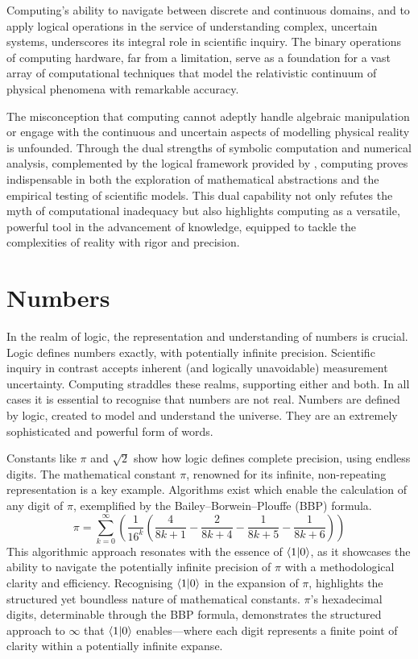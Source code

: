 \documentclass[12pt]{article}
\begin{document}
Computing's ability to navigate between discrete and continuous domains, and to apply logical operations in the service of understanding complex, uncertain systems, underscores its integral role in scientific inquiry. The binary operations of computing hardware, far from a limitation, serve as a foundation for a vast array of computational techniques that model the relativistic continuum of physical phenomena with remarkable accuracy.

The misconception that computing cannot adeptly handle algebraic manipulation or engage with the continuous and uncertain aspects of modelling physical reality is unfounded. Through the dual strengths of symbolic computation and numerical analysis, complemented by the logical framework provided by \iR{}, computing proves indispensable in both the exploration of mathematical abstractions and the empirical testing of scientific models. This dual capability not only refutes the myth of computational inadequacy but also highlights computing as a versatile, powerful tool in the advancement of knowledge, equipped to tackle the complexities of reality with rigor and precision.

\section*{Numbers}

In the realm of logic, the representation and understanding of numbers is crucial. Logic defines numbers exactly, with potentially infinite precision. Scientific inquiry in contrast accepts inherent (and logically unavoidable) measurement uncertainty. Computing straddles these realms, supporting either and both. In all cases it is essential to recognise that numbers are not real. Numbers are defined by logic, created to model and understand the universe. They are an extremely sophisticated and powerful form of words.

Constants like \(\pi\) and \(\sqrt{2}\) show how logic defines complete precision, using endless digits. The mathematical constant \(\pi\), renowned for its infinite, non-repeating representation is a key example. Algorithms exist which enable the calculation of any digit of \(\pi\), exemplified by the Bailey–Borwein–Plouffe (BBP) formula.
\[ \pi = \sum_{k=0}^{\infty} \left( \frac{1}{16^k} \left( \frac{4}{8k + 1} - \frac{2}{8k + 4} - \frac{1}{8k + 5} - \frac{1}{8k + 6} \right) \right) \]
This algorithmic approach resonates with the essence of \(\langle 1 | 0 \rangle\), as it showcases the ability to navigate the potentially infinite precision of \(\pi\) with a methodological clarity and efficiency. Recognising \(\langle 1 | 0 \rangle\) in the expansion of \(\pi\), highlights the structured yet boundless nature of mathematical constants. \(\pi\)'s hexadecimal digits, determinable through the BBP formula, demonstrates the structured approach to \(\infty\) that \(\langle 1 | 0 \rangle\) enables—where each digit represents a finite point of clarity within a potentially infinite expanse.
\end{document}
